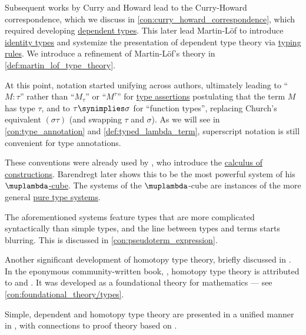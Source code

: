 \begin{remark}
  Subsequent works by Curry and Howard lead to the Curry-Howard correspondence, which we discuss in \cref{con:curry_howard_correspondence}, which required developing \hyperref[con:dependent_type]{dependent types}. This later lead Martin-Löf to introduce \hyperref[def:identity_type]{identity types} and systemize the presentation of dependent type theory via \hyperref[con:typing_rule]{typing rules}. We introduce a refinement of Martin-L\"of's theory in \cref{def:martin_lof_type_theory}.

  At this point, notation started unifying across authors, ultimately leading to \enquote{\( M: \tau \)} rather than \enquote{\( M_\tau \)} or \enquote{\( M^\tau \)} for \hyperref[def:type_assertion]{type assertions} postulating that the term \( M \) has type \( \tau \), and to \( \tau \synimplies \sigma \) for \enquote{function types}, replacing Church's equivalent \( (\sigma\tau) \) (and swapping \( \tau \) and \( \sigma \)). As we will see in \cref{con:type_annotation} and \cref{def:typed_lambda_term}, superscript notation is still convenient for type annotations.

  These conventions were already used by \textcite{CoquandHuet1986CoC}, who introduce the \hyperref[def:lambda_cube/combinations]{calculus of constructions}. Barendregt later shows this to be the most powerful system of his \hyperref[def:lambda_cube]{\( \muplambda \)-cube}. The systems of the \( \muplambda \)-cube are instances of the more general \hyperref[def:pure_type_system]{pure type systems}.

  The aforementioned systems feature types that are more complicated syntactically than simple types, and the line between types and terms starts blurring. This is discussed in \cref{con:pseudoterm_expression}.

  Another significant development of homotopy type theory, briefly discussed in . In the eponymous community-written book, \cite{UnivalentFoundationsProgram2013HoTT}, homotopy type theory is attributed to \textcite{Voevodsky2006HoTT} and \textcite{AwodeyWarren2009HoTT}. It was developed as a foundational theory for mathematics --- see \cref{con:foundational_theory/types}.
\end{remark}
\begin{comments}
  \item Simple, dependent and homotopy type theory are presented in a unified manner in \cite{Mimram2020ProgramEqualsProof}, with connections to proof theory based on .
\end{comments}

